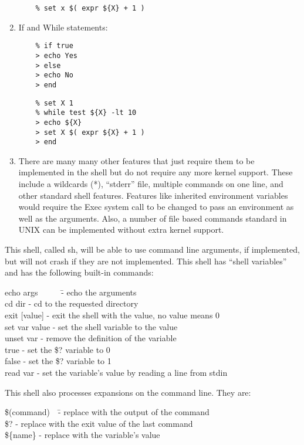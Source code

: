 \documentclass[11pt]{article}
\begin{document}
\begin{enumerate}
\begin{verbatim}
    % set x $( expr ${X} + 1 )
\end{verbatim}

\item If and While statements:

\begin{verbatim}
    % if true  
    > echo Yes
    > else 
    > echo No
    > end
\end{verbatim}
  
\begin{verbatim}
    % set X 1
    % while test ${X} -lt 10
    > echo ${X}
    > set X $( expr ${X} + 1 )
    > end
\end{verbatim}

\item There are many many other features that just require them to be
  implemented in the shell but do not require any more kernel support.
  These include a wildcards (*), ``stderr'' file, multiple commands on
  one line, and other standard shell features.  Features like
  inherited environment variables would require the Exec system call
  to be changed to pass an environment as well as the arguments.
  Also, a number of file based commands standard in UNIX can be
  implemented without extra kernel support.
\end{enumerate}

This shell, called sh, will be able to use command line arguments,
if implemented, but will not crash if they are not implemented.
This shell has ``shell variables'' and has the following built-in
commands:
\begin{tabbing}
echo args \ \ \ \ \ \=	- echo the arguments \\
cd dir \>- cd to the requested directory \\
exit [value] \>- exit the shell with the value, no value means 0 \\
set var value  \> - set the shell variable to the value \\
unset var  \> - remove the definition of the variable \\
true  \> - set the \$? variable to 0 \\
false  \> - set the \$? variable to 1 \\
read var \> - set the variable's value by reading a line from stdin \\
\end{tabbing}

This shell also processes expansions on the command line.  They are:
\begin{tabbing}
\$(command)\ \ \= - replace with the output of the command \\
\$? \> - replace with the exit value of the last command \\
\$\{name\} \> - replace with the variable's value
\end{tabbing}
\end{document}

